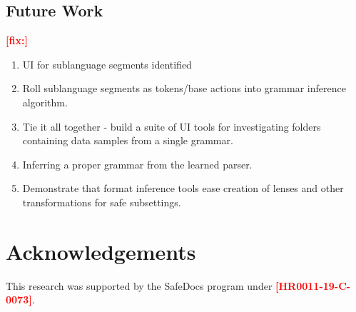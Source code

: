 \documentclass[conference,12pt]{IEEEtran}
\newcommand{\Todo}[1]{\textbf{\textcolor{red}{[#1]}}}
\begin{document}
\subsection{Future Work}
\Todo{fix:}
\begin{enumerate}
    \item UI for sublanguage segments identified
    \item Roll sublanguage segments as tokens/base actions into grammar inference algorithm.
    \item Tie it all together - build a suite of UI tools for investigating folders containing data samples from a single grammar.
    \item Inferring a proper grammar from the learned parser.
    \item Demonstrate that format inference tools ease creation of lenses and other transformations for safe subsettings.
\end{enumerate}


\section*{Acknowledgements}

This research was supported by the SafeDocs program under \Todo{HR0011-19-C-0073}.




% 
\end{document}
